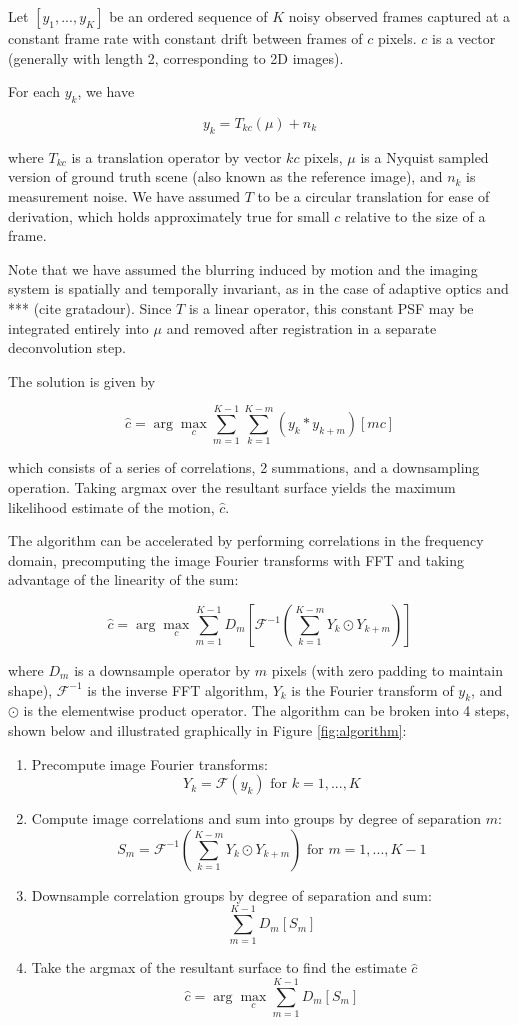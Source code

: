 \documentclass{article}
\begin{document}
Let $[y_1, ..., y_K]$ be an ordered sequence of $K$ noisy observed frames captured at a constant frame rate with constant drift between frames of $c$ pixels. $c$ is a vector (generally with length 2, corresponding to 2D images).

For each $y_k$, we have

$$y_k = T_{kc}(\mu) + n_k$$

where $T_{kc}$ is a translation operator by vector $kc$ pixels, $\mu$ is a Nyquist sampled version of ground truth scene (also known as the reference image), and $n_k$ is measurement noise.  We have assumed $T$ to be a circular translation for ease of derivation, which holds approximately true for small $c$ relative to the size of a frame.

Note that we have assumed the blurring induced by motion and the imaging system is spatially and temporally invariant, as in the case of adaptive optics and *** (cite gratadour).  Since $T$ is a linear operator, this constant PSF may be integrated entirely into $\mu$ and removed after registration in a separate deconvolution step.

The solution is given by

$$
\hat{c} = \arg \max_c \sum_{m=1}^{K-1}\sum_{k=1}^{K-m} (y_k \ast y_{k+m})[mc]
$$

which consists of a series of correlations, 2 summations, and a downsampling operation.  Taking argmax over the resultant surface yields the maximum likelihood estimate of the motion, $\hat{c}$.

The algorithm can be accelerated by performing correlations in the frequency domain, precomputing the image Fourier transforms with FFT and taking advantage of the linearity of the sum:

\begin{equation}
\hat{c} = \arg \max_c \sum_{m=1}^{K-1} D_m \left[
\mathcal{F}^{-1} \left( \sum_{k=1}^{K-m} Y_k \odot Y_{k+m} \right)
\right]
\label{eq:algorithm}
\end{equation}

where $D_m$ is a downsample operator by $m$ pixels (with zero padding to maintain shape), $\mathcal{F}^{-1}$ is the inverse FFT algorithm, $Y_k$ is the Fourier transform of $y_k$, and $\odot$ is the elementwise product operator.
The algorithm can be broken into 4 steps, shown below and illustrated graphically in Figure \ref{fig:algorithm}:

\begin{enumerate}
  \item Precompute image Fourier transforms:
    $$Y_k=\mathcal{F}(y_k) \text{ for } k=1,...,K$$
  \item Compute image correlations and sum into groups by degree of separation $m$:
    $$S_m = \mathcal{F}^{-1} \left( \sum_{k=1}^{K-m} Y_k \odot Y_{k+m} \right) \text{ for } m=1, ..., K-1$$
  \item Downsample correlation groups by degree of separation and sum:
    $$\sum_{m=1}^{K-1} D_m \left[ S_m \right]$$
  \item Take the argmax of the resultant surface to find the estimate $\hat{c}$
    $$\hat{c} = \arg \max_c \sum_{m=1}^{K-1} D_m \left[ S_m \right]$$
\end{enumerate}
\end{document}
